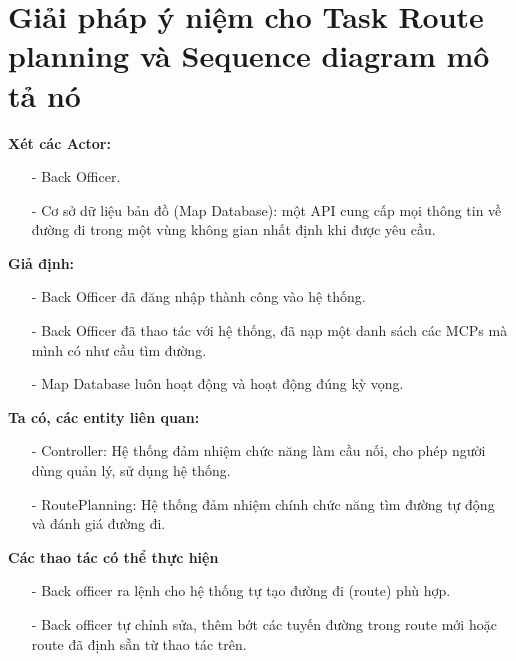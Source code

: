 \section{Giải pháp ý niệm cho Task Route planning và Sequence diagram mô tả nó}

    \textbf{Xét các Actor: }
    
    \begin{itemize}
        \item[-] Back Officer.
        \item[-] Cơ sở dữ liệu bản đồ (Map Database): một API cung cấp mọi thông tin về đường đi trong một vùng không gian nhất định khi được yêu cầu.
    \end{itemize}
    
    \textbf{Giả định:}
    
    \begin{itemize}
        \item[-] Back Officer đã đăng nhập thành công vào hệ thống.
        \item[-] Back Officer đã thao tác với hệ thống, đã nạp một danh sách các MCPs mà mình có như cầu tìm đường.
        \item[-] Map Database luôn hoạt động và hoạt động đúng kỳ vọng.
    \end{itemize}
    
    \textbf{Ta có, các entity liên quan:}
    
    \begin{itemize}
        \item[-] Controller: Hệ thống đảm nhiệm chức năng làm cầu nối, cho phép người dùng quản lý, sử dụng hệ thống.
        \item[-] RoutePlanning: Hệ thống đảm nhiệm chính chức năng tìm đường tự động và đánh giá đường đi.
    \end{itemize}
    
    \textbf{Các thao tác có thể thực hiện}
    
    \begin{itemize}
        \item[-] Back officer ra lệnh cho hệ thống tự tạo đường đi (route) phù hợp.
        \item[-] Back officer tự chỉnh sửa, thêm bớt các tuyến đường trong route mới hoặc route đã định sẵn từ thao tác trên.
    \end{itemize}
    
